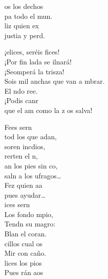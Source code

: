 \documentclass[12pt]{article}
\begin{document}
\begin{multicols*}{2}
\begin{cancion}
	os los dechos\\
	pa todo el mun.\\
	liz quien ex\\
	justia y perd. \\
	\begin{chorus}%
	¡elices, seréis fices!\\
	¡Por fin lada se ilnará!\\
	¡Seomperá la trisza!\\
	Sois mil anchas que van a mbrar.\\
	El ndo ree.\\
	¡Podis canr\\
	que el am como la z os salva!\\
	\end{chorus}%
	Fees sern\\
	tod los que adan,\\
	soren incdios,\\
	rerten el n,\\
	an los pies sin co,\\
	saln a los ufragos… \\
	Fez quien aa\\
	pues  ayudar…\\
	ices sern\\
	Los  fondo mpio,\\
	Tendn su magro:\\
	Blan el coran. \\
	cillos cual os \\
	Mir con caño.\\
	lices los pios\\
	Pues rán aos\\

\end{cancion}
\end{multicols*}
\end{document}

